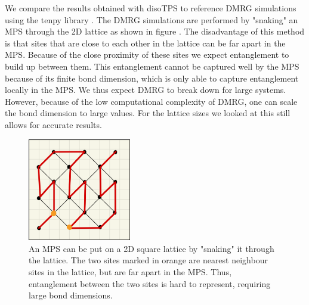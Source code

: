 We compare the results obtained with disoTPS to reference DMRG simulations using the tenpy library \cite{cite:tenpy}. The DMRG simulations are performed by "snaking" an MPS through the 2D lattice as shown in figure . The disadvantage of this method is that sites that are close to each other in the lattice can be far apart in the MPS. Because of the close proximity of these sites we expect entanglement to build up between them. This entanglement cannot be captured well by the MPS because of its finite bond dimension, which is only able to capture entanglement locally in the MPS. We thus expect DMRG to break down for large systems. However, because of the low computational complexity of DMRG, one can scale the bond dimension to large values. For the lattice sizes we looked at this still allows for accurate results.
\begin{figure}
\centering
\includegraphics[width=0.4\textwidth]{figures/TFI/tenpy_snaking.jpeg}
\caption{An MPS can be put on a 2D square lattice by "snaking" it through the lattice. The two sites marked in orange are nearest neighbour sites in the lattice, but are far apart in the MPS. Thus, entanglement between the two sites is hard to represent, requiring large bond dimensions.}
\label{fig:tenpy_snaking}
\end{figure}
